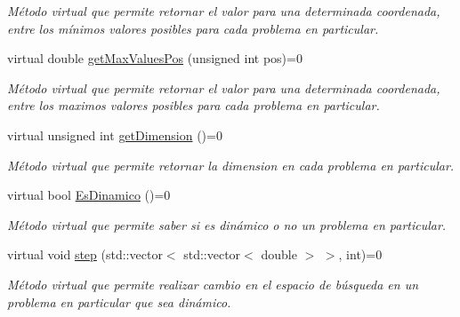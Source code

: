 \begin{DoxyCompactItemize}
\begin{DoxyCompactList}\small\item\em Método virtual que permite retornar el valor para una determinada coordenada, entre los mínimos valores posibles para cada problema en particular. \end{DoxyCompactList}\item 
\hypertarget{class_problem_a2ffe7de8658a25398d6a21dd1b2edfcb}{virtual double \hyperlink{class_problem_a2ffe7de8658a25398d6a21dd1b2edfcb}{get\+Max\+Values\+Pos} (unsigned int pos)=0}\label{class_problem_a2ffe7de8658a25398d6a21dd1b2edfcb}

\begin{DoxyCompactList}\small\item\em Método virtual que permite retornar el valor para una determinada coordenada, entre los maximos valores posibles para cada problema en particular. \end{DoxyCompactList}\item 
\hypertarget{class_problem_a6f72067600654aef0767bce95c4eacdd}{virtual unsigned int \hyperlink{class_problem_a6f72067600654aef0767bce95c4eacdd}{get\+Dimension} ()=0}\label{class_problem_a6f72067600654aef0767bce95c4eacdd}

\begin{DoxyCompactList}\small\item\em Método virtual que permite retornar la dimension en cada problema en particular. \end{DoxyCompactList}\item 
\hypertarget{class_problem_a481dc3e5869cf95b3c539d552e8eeb50}{virtual bool \hyperlink{class_problem_a481dc3e5869cf95b3c539d552e8eeb50}{Es\+Dinamico} ()=0}\label{class_problem_a481dc3e5869cf95b3c539d552e8eeb50}

\begin{DoxyCompactList}\small\item\em Método virtual que permite saber si es dinámico o no un problema en particular. \end{DoxyCompactList}\item 
\hypertarget{class_problem_a0c7025eb5127b1eda7988cceadc00da6}{virtual void \hyperlink{class_problem_a0c7025eb5127b1eda7988cceadc00da6}{step} (std\+::vector$<$ std\+::vector$<$ double $>$ $>$, int)=0}\label{class_problem_a0c7025eb5127b1eda7988cceadc00da6}

\begin{DoxyCompactList}\small\item\em Método virtual que permite realizar cambio en el espacio de búsqueda en un problema en particular que sea dinámico. \end{DoxyCompactList}\end{DoxyCompactItemize}
